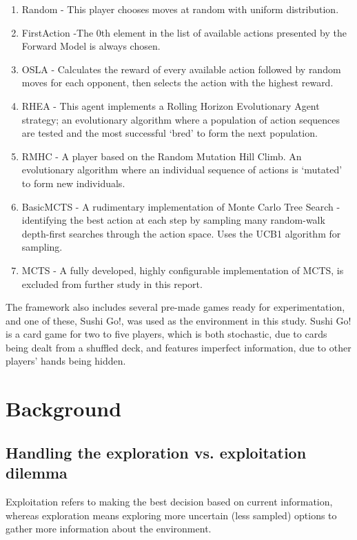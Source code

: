 \documentclass[conference]{IEEEtran}
\begin{document}
\begin{enumerate}
\item Random - This player chooses moves at random with uniform distribution. 
\item FirstAction -The 0th element in the list of available actions presented by the Forward Model is always chosen. 
\item OSLA - Calculates the reward of every available action followed by random moves for each opponent, then selects the action with the highest reward.
\item RHEA - This agent implements a Rolling Horizon Evolutionary Agent strategy; an evolutionary algorithm where a  population of action sequences are tested and the most successful ‘bred’ to form the next population. 
\item RMHC - A player based on the Random Mutation Hill Climb. An evolutionary algorithm where an individual sequence of actions is ‘mutated’ to form new individuals.
\item BasicMCTS - A rudimentary implementation of Monte Carlo Tree Search - identifying the best action at each step by sampling many random-walk depth-first searches through the action space. Uses the UCB1 algorithm for sampling. 
\item MCTS - A fully developed, highly configurable implementation of MCTS, is excluded from further study in this report.
\end{enumerate}

The framework also includes several pre-made games ready for experimentation, and one of these, Sushi Go!, was used as the environment in this study. Sushi Go! is a card game for two to five players, which is both stochastic, due to cards being dealt from a shuffled deck, and features imperfect information, due to other players’ hands being hidden.

\section{Background}

\subsection{Handling the exploration vs. exploitation dilemma}
Exploitation refers to making the best decision based on current information, whereas exploration means exploring more uncertain (less sampled) options to gather more information about the environment.
\end{document}
